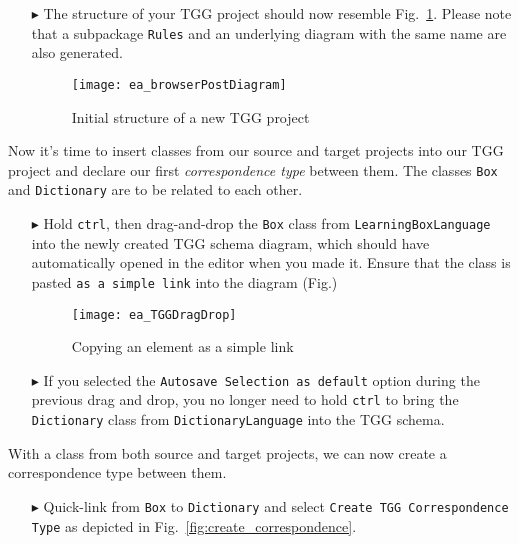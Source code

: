 \begin{itemize}
\item[$\blacktriangleright$] The structure of your TGG project should now resemble Fig.~\ref{fig:new_tgg_project}. Please note that a subpackage \texttt{Rules}
and an underlying diagram with the same name are also generated.

\begin{figure}[htbp]
\begin{center}
  \texttt{[image: ea\_browserPostDiagram]}
  \caption{Initial structure of a new TGG project}  
  \label{fig:new_tgg_project}
\end{center}
\end{figure}
\end{itemize}
\clearpage

Now it's time to insert classes from our source and target projects into our TGG project and declare our first \emph{correspondence type} between them.
The classes \texttt{Box} and \texttt{Dictionary} are to be related to each other.

\begin{itemize}
\item[$\blacktriangleright$] Hold \texttt{ctrl}, then drag-and-drop the \texttt{Box} class from \texttt{Learning\-Box\-Language} into the newly created TGG
schema diagram, which should have automatically opened in the editor when you made it. Ensure that the class is pasted \texttt{as a simple link} into the
diagram (Fig.)

\begin{figure}[htbp]
\begin{center}
  \texttt{[image: ea\_TGGDragDrop]}
  \caption{Copying an element as a simple link} 
  \label{fig:TGGdragDrop}
\end{center}
\end{figure}

\item[$\blacktriangleright$] If you selected the \texttt{Autosave Selection as default} option during the previous drag and drop, you no longer need to hold
\texttt{ctrl} to bring the \texttt{Dictionary} class from \texttt{Dictionary\-Language} into the TGG schema.
\end{itemize}

With a class from both source and target projects, we can now create a correspondence type between them.

\begin{itemize}
\item[$\blacktriangleright$] Quick-link from \texttt{Box} to \texttt{Dictionary} and select \texttt{Create TGG Corres\-pon\-dence Type} as depicted in
Fig.~\ref{fig:create_correspondence}.
\end{itemize}


